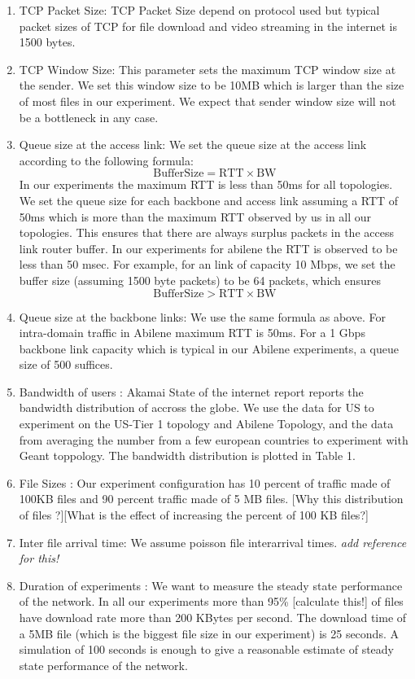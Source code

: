 \documentclass[a4paper,10pt]{article}
\begin{document}
\begin{enumerate}
\item 
TCP Packet Size: TCP Packet Size depend on protocol used but typical packet sizes of TCP for file download and video streaming in the internet is 1500 bytes. 
\item 
TCP Window Size: This parameter sets the maximum TCP window size at the sender. We set this window size to be 10MB which is larger than the size of most files in our experiment. We expect that sender window size will not be a bottleneck in any case.
\item 
Queue size at the access link: We set the queue size at the access link according to the following formula: 
\[\mbox{BufferSize} = \mbox{RTT} \times \mbox{BW}\] 
In our experiments the maximum RTT is less than 50ms for all topologies. We set the queue size for each backbone and access link assuming a RTT of 50ms which is more than the maximum RTT observed by us in all our topologies. This ensures that there are always surplus packets in the access link router buffer. In our experiments for abilene the RTT is observed to be less than 50 msec. For example, for an link of capacity 10 Mbps, we set the buffer size (assuming 1500 byte packets) to be 64 packets, which ensures \[\mbox{BufferSize} > \mbox{RTT} \times \mbox{BW}\] 
\item
Queue size at the backbone links: We use the same formula as above. For intra-domain traffic in Abilene maximum RTT is 50ms. For a 1 Gbps backbone link capacity which is typical in our Abilene experiments, a queue size of 500 suffices. 
\item
Bandwidth of users : 
Akamai State of the internet report \cite{Akamai-soti} reports the bandwidth distribution of accross the globe. We use the data for US to experiment on the US-Tier 1 topology and Abilene Topology, and the data from averaging the number from a few european countries to experiment with Geant toppology. The bandwidth distribution is plotted in Table 1.
\item
File Sizes : Our experiment configuration has 10 percent of traffic made of 100KB files and 90 percent traffic made of 5 MB files. [Why this distribution of files ?][What is the effect of increasing the percent of 100 KB files?]
\item
Inter file arrival time: We assume poisson file interarrival times. \emph{add reference for this!}
\item
Duration of experiments : We want to measure the steady state performance of the network.  In all our experiments more than 95\% [calculate this!] of files have download rate more than 200 KBytes per second. The download time of a 5MB file (which is the biggest file size in our experiment)  is 25 seconds. A simulation of 100 seconds is enough to give a reasonable estimate of steady state performance of the network.
\end{enumerate}
\end{document}
